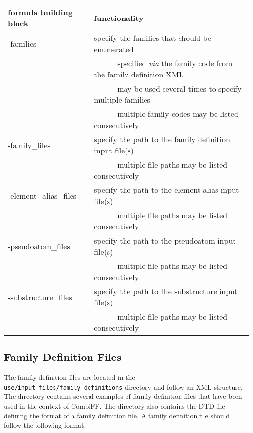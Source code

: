 \documentclass[a4paper,11pt]{article}
\newcommand{\tabitem}{~~\llap{\textbullet}~~}
\begin{document}
\begin{table}[H]
\begin{tabular}{>{\ttfamily\raggedright}p{}|p{}}
    \hline
    \textnormal{formula building block} & functionality \\
    \hline\hline
    -families & specify the families that should be enumerated\\
              & ~~\tabitem specified \textit{via} the family code from the family definition XML\\
              & ~~\tabitem may be used several times to specify multiple families\\
              & ~~\tabitem multiple family codes may be listed consecutively\\
    \hline
    -family\_files & specify the path to the family definition input file(s)\\
                   & ~~\tabitem multiple file paths may be listed consecutively\\
    \hline
    -element\_alias\_files & specify the path to the element alias input file(s)\\
                   & ~~\tabitem multiple file paths may be listed consecutively\\
    \hline
    -pseudoatom\_files & specify the path to the pseudoatom input file(s)\\
                   & ~~\tabitem multiple file paths may be listed consecutively\\
    \hline
    -substructure\_files & specify the path to the substructure input file(s)\\
                   & ~~\tabitem multiple file paths may be listed consecutively\\
\end{tabular}
\end{table}

\subsection{Family Definition Files}\label{sec:family}

The family definition files are located in the \texttt{use/input\_files/family\_definitions} directory and follow an XML structure. The directory contains several examples of family definition files that have been used in the context of CombiFF. The directory also contains the DTD file defining the format of a family definition file. A family definition file should follow the following format:
\end{document}
